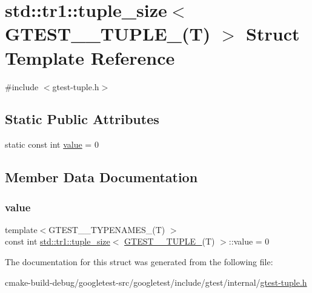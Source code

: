 \hypertarget{structstd_1_1tr1_1_1tuple__size_3_01GTEST__0__TUPLE___07T_08_01_4}{}\section{std\+::tr1\+::tuple\+\_\+size$<$ G\+T\+E\+S\+T\+\_\+\_\+\+T\+U\+P\+L\+E\+\_\+(T) $>$ Struct Template Reference}
\label{structstd_1_1tr1_1_1tuple__size_3_01GTEST__0__TUPLE___07T_08_01_4}


{\ttfamily \#include $<$gtest-\/tuple.\+h$>$}

\subsection*{Static Public Attributes}
\begin{DoxyCompactItemize}
\item 
static const int \mbox{\hyperlink{structstd_1_1tr1_1_1tuple__size_3_01GTEST__0__TUPLE___07T_08_01_4_af34d6d0b87d7379b14817a386c1e18ee}{value}} = 0
\end{DoxyCompactItemize}


\subsection{Member Data Documentation}
\mbox{\label{structstd_1_1tr1_1_1tuple__size_3_01GTEST__0__TUPLE___07T_08_01_4_af34d6d0b87d7379b14817a386c1e18ee}} 
\subsubsection{\texorpdfstring{value}{value}}
{\footnotesize\ttfamily template$<$G\+T\+E\+S\+T\+\_\+\_\+\+T\+Y\+P\+E\+N\+A\+M\+E\+S\+\_\+(\+T) $>$ \\
const int \mbox{\hyperlink{structstd_1_1tr1_1_1tuple__size}{std\+::tr1\+::tuple\+\_\+size}}$<$ \mbox{\hyperlink{gtest-tuple_8h_acecddf48fa29ec4b0199d5a467e89778}{G\+T\+E\+S\+T\+\_\+\_\+\+T\+U\+P\+L\+E\+\_\+}}(T) $>$\+::value = 0\hspace{0.3cm}{\ttfamily [static]}}



The documentation for this struct was generated from the following file\+:\begin{DoxyCompactItemize}
\item 
cmake-\/build-\/debug/googletest-\/src/googletest/include/gtest/internal/\mbox{\hyperlink{gtest-tuple_8h}{gtest-\/tuple.\+h}}\end{DoxyCompactItemize}

